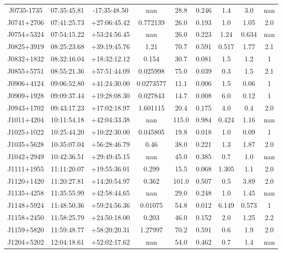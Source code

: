 \begin{table}[H]
\begin{tabular}{@{}ccccccccc@{}}
        J0735-1735 & 07:35:45.81 & -17:35:48.50 & nan & 28.8 & 0.246 & 1.4 & 3.0 & nan \\
        J0741+2706 & 07:41:25.73 & +27:06:45.42 & 0.772139 & 26.0 & 0.193 & 1.0 & 1.05 & 2.0 \\
        J0754+5324 & 07:54:15.22 & +53:24:56.45 & nan & 26.0 & 0.223 & 1.24 & 0.634 & nan \\
        J0825+3919 & 08:25:23.68 & +39:19:45.76 & 1.21 & 70.7 & 0.591 & 0.517 & 1.77 & 2.1 \\
        J0832+1832 & 08:32:16.04 & +18:32:12.12 & 0.154 & 30.7 & 0.081 & 1.5 & 1.2 & 1 \\
        J0855+5751 & 08:55:21.36 & +57:51:44.09 & 0.025998 & 75.0 & 0.039 & 0.3 & 1.5 & 2.1 \\
        J0906+4124 & 09:06:52.80 & +41:24:30.00 & 0.0273577 & 11.1 & 0.006 & 1.5 & 0.06 & 1 \\
        J0909+1928 & 09:09:37.44 & +19:28:08.30 & 0.027843 & 14.7 & 0.008 & 6.0 & 0.12 & 1 \\
        J0943+1702 & 09:43:17.23 & +17:02:18.97 & 1.601115 & 20.4 & 0.175 & 4.0 & 0.4 & 2.0 \\
        J1011+4204 & 10:11:54.18 & +42:04:33.38 & nan & 115.0 & 0.984 & 0.424 & 1.16 & nan \\
        J1025+1022 & 10:25:44.20 & +10:22:30.00 & 0.045805 & 19.8 & 0.018 & 1.0 & 0.09 & 1 \\
        J1035+5628 & 10:35:07.04 & +56:28:46.79 & 0.46 & 38.0 & 0.221 & 1.3 & 1.87 & 2.0 \\
        J1042+2949 & 10:42:36.51 & +29:49:45.15 & nan & 45.0 & 0.385 & 0.7 & 1.0 & nan \\
        J1111+1955 & 11:11:20.07 & +19:55:36.01 & 0.299 & 15.5 & 0.068 & 1.305 & 1.1 & 2.0 \\
        J1120+1420 & 11:20:27.81 & +14:20:54.97 & 0.362 & 101.0 & 0.507 & 0.5 & 3.89 & 2.0 \\
        J1135+4258 & 11:35:55.99 & +42:58:44.65 & nan & 29.0 & 0.248 & 1.0 & 1.45 & nan \\
        J1148+5924 & 11:48:50.36 & +59:24:56.36 & 0.01075 & 54.8 & 0.012 & 6.149 & 0.573 & 1 \\
        J1158+2450 & 11:58:25.79 & +24:50:18.00 & 0.203 & 46.0 & 0.152 & 2.0 & 1.25 & 2.2 \\
        J1159+5820 & 11:59:48.77 & +58:20:20.31 & 1.27997 & 70.2 & 0.591 & 0.6 & 1.9 & 2.0 \\
        J1204+5202 & 12:04:18.61 & +52:02:17.62 & nan & 54.0 & 0.462 & 0.7 & 1.4 & nan \\

        \bottomrule
    \end{tabular}
\end{table}


